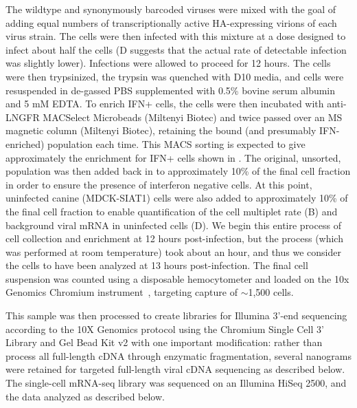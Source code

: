 \documentclass[9pt,lineno]{elife}
\begin{document}
The wildtype and synonymously barcoded viruses were mixed with the goal of adding equal numbers of transcriptionally active HA-expressing virions of each virus strain.
The cells were then infected with this mixture at a dose designed to infect about half the cells (D suggests that the actual rate of detectable infection was slightly lower).
Infections were allowed to proceed for 12 hours.
The cells were then trypsinized, the trypsin was quenched with D10 media, and cells were resuspended in de-gassed PBS supplemented with 0.5\% bovine serum albumin and 5 mM EDTA. 
To enrich IFN+ cells, the cells were then incubated with anti-LNGFR MACSelect Microbeads (Miltenyi Biotec) and twice passed over an MS magnetic column (Miltenyi Biotec), retaining the bound (and presumably IFN-enriched) population each time. 
This MACS sorting is expected to give approximately the enrichment for IFN+ cells shown in .
The original, unsorted, population was then added back in to approximately 10\% of the final cell fraction in order to ensure the presence of interferon negative cells. 
At this point, uninfected canine (MDCK-SIAT1) cells were also added to approximately 10\% of the final cell fraction to enable quantification of the cell multiplet rate (B) and background viral mRNA in uninfected cells (D). 
We begin this entire process of cell collection and enrichment at 12 hours post-infection, but the process (which was performed at room temperature) took about an hour, and thus we consider the cells to have been analyzed at 13 hours post-infection.
The final cell suspension was counted using a disposable hemocytometer and loaded on the 10x Genomics Chromium instrument~\citep{zheng2017massively}, targeting capture of $\sim$1,500 cells. 

This sample was then processed to create libraries for Illumina 3'-end sequencing according to the 10X Genomics protocol using the Chromium Single Cell 3' Library and Gel Bead Kit v2 with one important modification: rather than process all full-length cDNA through enzymatic fragmentation, several nanograms were retained for targeted full-length viral cDNA sequencing as described below.
The single-cell mRNA-seq library was sequenced on an Illumina HiSeq 2500, and the data analyzed as described below.
\end{document}
